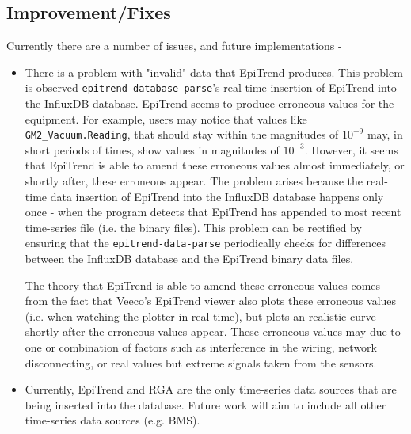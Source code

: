 \documentclass{article}
\begin{document}
\subsection{Improvement/Fixes}

Currently there are a number of issues, and future implementations -

\begin{itemize}
    \item There is a problem with "invalid" data that EpiTrend produces. This problem is observed \texttt{epitrend-database-parse}'s real-time insertion of EpiTrend into the InfluxDB database. EpiTrend seems to produce erroneous values for the equipment. For example, users may notice that values like \texttt{GM2\_Vacuum.Reading}, that should stay within the magnitudes of $10^{-9}$ may, in short periods of times, show values in magnitudes of $10^{-3}$. However, it seems that EpiTrend is able to amend these erroneous values almost immediately, or shortly after, these erroneous appear. The problem arises because the real-time data insertion of EpiTrend into the InfluxDB database happens only once - when the program detects that EpiTrend has appended to most recent time-series file (i.e. the binary files). This problem can be rectified by ensuring that the \texttt{epitrend-data-parse} periodically checks for differences between the InfluxDB database and the EpiTrend binary data files. 
    
    \vspace{5pt}
    \noindent
    The theory that EpiTrend is able to amend these erroneous values comes from the fact that Veeco's EpiTrend viewer also plots these erroneous values (i.e. when watching the plotter in real-time), but plots an realistic curve shortly after the erroneous values appear. 
    These erroneous values may due to one or combination of factors such as interference in the wiring, network disconnecting, or real values but extreme signals taken from the sensors.

    \item Currently, EpiTrend and RGA are the only time-series data sources that are being inserted into the database. Future work will aim to include all other time-series data sources (e.g. BMS).
\end{itemize}




\end{document}
